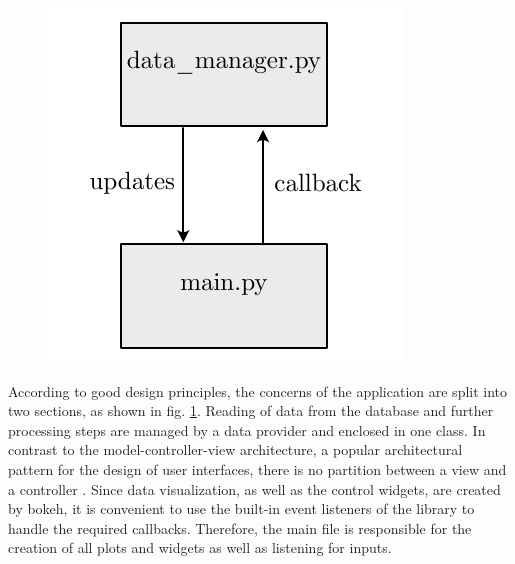     \begin{figure}[h]
    \capstart
        \centering
    	\includegraphics{Abbildung/vis_architecture.pdf}

    	\begin{minipage}{\captionwidth}
    		\caption[vis archi]{}
    		\label{fig:plot_architecture}
    	\end{minipage}
    \end{figure}

According to good design principles, the concerns of the application are split into two sections, as shown in fig. \ref{fig:plot_architecture}. Reading of data from the database and further processing steps are managed by a data provider and enclosed in one class. In contrast to the model-controller-view architecture, a popular architectural pattern for the design of user interfaces, there is no partition between a view and a controller \cite{langtangenUsingWebFrameworks2015}. Since data visualization, as well as the control widgets, are created by bokeh, it is convenient to use the built-in event listeners of the library to handle the required callbacks. Therefore, the main file is responsible for the creation of all plots and widgets as well as listening for inputs.

